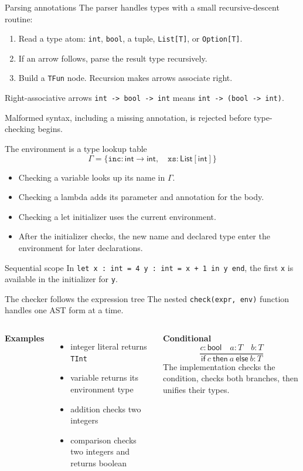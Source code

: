 \documentclass[aspectratio=169,11pt]{beamer}
\newcommand{\Int}{\mathsf{int}}
\newcommand{\Bool}{\mathsf{bool}}
\newcommand{\ListT}[1]{\mathsf{List}[#1]}
\begin{document}
\begin{frame}{Parsing annotations}
The parser handles types with a small recursive-descent routine:
\begin{enumerate}
  \item Read a type atom: \texttt{int}, \texttt{bool}, a tuple, \texttt{List[T]}, or \texttt{Option[T]}.
  \item If an arrow follows, parse the result type recursively.
  \item Build a \texttt{TFun} node. Recursion makes arrows associate right.
\end{enumerate}
\begin{exampleblock}{Right-associative arrows}
\texttt{int -> bool -> int} means \texttt{int -> (bool -> int)}.
\end{exampleblock}
Malformed syntax, including a missing annotation, is rejected before type-checking begins.
\end{frame}

\begin{frame}{The environment is a type lookup table}
\[
\Gamma = \{\texttt{inc}:\Int\to\Int,\quad \texttt{xs}:\ListT{\Int}\}
\]
\begin{itemize}
  \item Checking a variable looks up its name in $\Gamma$.
  \item Checking a lambda adds its parameter and annotation for the body.
  \item Checking a let initializer uses the current environment.
  \item After the initializer checks, the new name and declared type enter the environment for later declarations.
\end{itemize}
\begin{block}{Sequential scope}
In \texttt{let x : int = 4 y : int = x + 1 in y end}, the first \texttt{x} is available in the initializer for \texttt{y}.
\end{block}
\end{frame}

\begin{frame}{The checker follows the expression tree}
The nested \texttt{check(expr, env)} function handles one AST form at a time.
\begin{columns}[T]
\textbf{Examples}
\begin{itemize}
  \item integer literal returns \texttt{TInt}
  \item variable returns its environment type
  \item addition checks two integers
  \item comparison checks two integers and returns boolean
\end{itemize}
\textbf{Conditional}
\[
\frac{c:\Bool\quad a:T\quad b:T}
     {\mathsf{if}\ c\ \mathsf{then}\ a\ \mathsf{else}\ b:T}
\]
The implementation checks the condition, checks both branches, then unifies their types.
\end{columns}
\end{frame}
\end{document}
